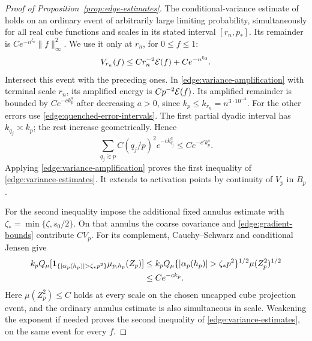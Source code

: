 \begin{proof}[Proof of Proposition~\ref{prop:edge-estimates}]
The conditional-variance estimate of
\cite[Proposition~4.1, Equation~(4.1)]{FUA} holds on an ordinary event
of arbitrarily large limiting probability, simultaneously for all real
cube functions and scales in its stated interval \([r_n,p_*]\).  Its
remainder is \(Ce^{-n^{\xi_0}}\|f\|_\infty^2\).  We use it only at
\(r_n\), for \(0\le f\le1\):
\[
 V_{r_n}(f)\le Cr_n^{-2}\mathcal E(f)+Ce^{-n^{\xi_0}}.
\]
Intersect this event with the preceding ones.  In
\eqref{edge:variance-amplification} with terminal scale \(r_n\), its
amplified energy is
\(Cp^{-2}\mathcal E(f)\).  Its amplified remainder is bounded by
\(Ce^{-c k_p^a}\) after decreasing \(a>0\), since
\(k_p\le k_{r_n}=n^{3\cdot10^{-4}}\).
For the other errors use \eqref{edge:quenched-error-intervals}.
The first partial dyadic interval has \(k_{q_j}\asymp k_p\); the rest
increase geometrically.  Hence
\[
 \sum_{q_j\gtrsim p}C(q_j/p)^2e^{-c k_{q_j}^a}
       \le C e^{-c'k_p^a}.
\]
Applying \eqref{edge:variance-amplification} proves
the first inequality of \eqref{edge:variance-estimates}.  It extends
to activation points by continuity of \(V_p\) in \(B_p\).

For the second inequality impose the additional fixed annulus estimate
with \(\zeta_*=\min\{\zeta,s_0/2\}\).  On that annulus the coarse covariance and
\eqref{edge:gradient-bounds} contribute \(CV_p\).  For its complement,
Cauchy--Schwarz and conditional Jensen give
\[
\begin{split}
 k_pQ_\mu[\ind_{\{|\alpha_p(h_p)|>\zeta_* p^2\}}\mu_{p,h_p}(Z_p)]
 &\le k_pQ_\mu\{|\alpha_p(h_p)|>\zeta_* p^2\}^{1/2}
       \mu(Z_p^2)^{1/2}\\
 &\le C e^{-c k_p}.
\end{split}
\]
Here \(\mu(Z_p^2)\le C\) holds at every scale on the chosen uncapped
cube projection event, and the ordinary annulus estimate is also
simultaneous in scale.  Weakening the exponent if needed proves the
second inequality of \eqref{edge:variance-estimates}, on the same
event for every \(f\).
\end{proof}
